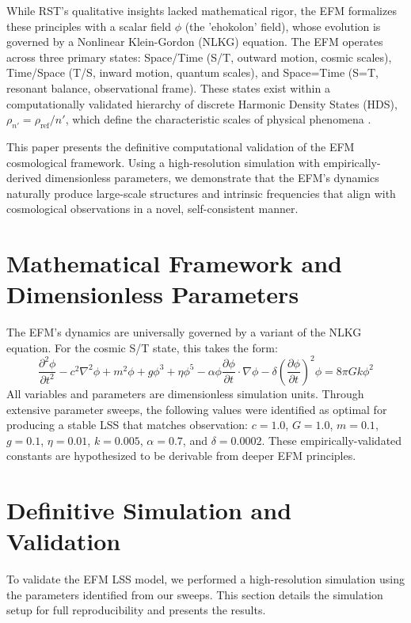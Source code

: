 \documentclass[11pt]{article}
\begin{document}
While RST’s qualitative insights lacked mathematical rigor, the EFM formalizes these principles with a scalar field \(\phi\) (the 'ehokolon' field), whose evolution is governed by a Nonlinear Klein-Gordon (NLKG) equation. The EFM operates across three primary states: Space/Time (S/T, outward motion, cosmic scales), Time/Space (T/S, inward motion, quantum scales), and Space=Time (S=T, resonant balance, observational frame). These states exist within a computationally validated hierarchy of discrete Harmonic Density States (HDS), \(\rho_{n'} = \rho_{\text{ref}}/n'\), which define the characteristic scales of physical phenomena \citep{emvula2025compendium}.

This paper presents the definitive computational validation of the EFM cosmological framework. Using a high-resolution simulation with empirically-derived dimensionless parameters, we demonstrate that the EFM's dynamics naturally produce large-scale structures and intrinsic frequencies that align with cosmological observations in a novel, self-consistent manner.

\section{Mathematical Framework and Dimensionless Parameters}
The EFM’s dynamics are universally governed by a variant of the NLKG equation. For the cosmic S/T state, this takes the form:
\begin{equation}
\frac{\partial^2\phi}{\partial t^2} - c^2\nabla^2\phi + m^2\phi + g\phi^3 + \eta\phi^5 - \alpha\phi\frac{\partial\phi}{\partial t}\cdot\nabla\phi - \delta\left(\frac{\partial\phi}{\partial t}\right)^2\phi = 8\pi Gk\phi^2
\label{eq:nlkg_full}
\end{equation}
All variables and parameters are dimensionless simulation units. Through extensive parameter sweeps, the following values were identified as optimal for producing a stable LSS that matches observation: \(c=1.0\), \(G=1.0\), \(m=0.1\), \(g=0.1\), \(\eta=0.01\), \(k=0.005\), \(\alpha=0.7\), and \(\delta=0.0002\). These empirically-validated constants are hypothesized to be derivable from deeper EFM principles.

\section{Definitive Simulation and Validation}
To validate the EFM LSS model, we performed a high-resolution simulation using the parameters identified from our sweeps. This section details the simulation setup for full reproducibility and presents the results.
\end{document}
